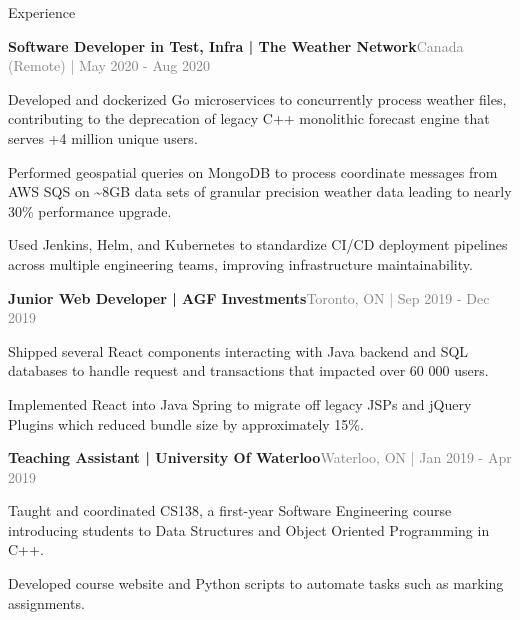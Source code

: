 \documentclass[hidelinks]{resume} %
\begin{document}
\begin{rSection}{Experience}
\begin{rSubsection}{\textbf{Software Developer in Test, Infra | The Weather Network}}{\textcolor{gray}{\small Canada (Remote) | May 2020 - Aug 2020}}{}
        \begin{bulletpoints}
            \vspace{-.10cm}
            \item Developed and dockerized Go microservices to concurrently process weather files, contributing to the deprecation of legacy C++ monolithic forecast engine that serves +4 million unique users.
             \vspace{-.13cm}
            \item Performed geospatial queries on MongoDB to process coordinate messages from AWS SQS on \textasciitilde 8GB data sets of granular precision weather data leading to nearly 30\% performance upgrade.
            \vspace{-.13cm}
             \item Used Jenkins, Helm, and Kubernetes to standardize CI/CD deployment pipelines across multiple engineering teams, improving infrastructure maintainability.
             \vspace{-.10cm}
        \end{bulletpoints}
\end{rSubsection}
\begin{rSubsection}{\textbf{Junior Web Developer | AGF Investments}}{\textcolor{gray}{\small Toronto, ON | Sep 2019 - Dec 2019}}{}
        \par
        \begin{bulletpoints}
            \vspace{-.10cm}
            \item Shipped several React components interacting with Java backend and SQL databases to handle request and transactions that impacted over 60 000 users.
            \vspace{-.13cm}
            \item Implemented React into Java Spring to migrate off legacy JSPs and jQuery Plugins which reduced bundle size by approximately 15\%.
             \vspace{-.10cm}
        \end{bulletpoints}
\end{rSubsection}
\begin{rSubsection}{\textbf{Teaching Assistant | University Of Waterloo}}{\textcolor{gray}{\small Waterloo, ON | Jan 2019 - Apr 2019}}{}

    \begin{bulletpoints}
        \vspace{-.10cm}
        \item Taught and coordinated CS138, a first-year Software Engineering course introducing students to Data Structures and Object Oriented Programming in C++.
        \vspace{-.13cm}
        \item Developed course website and Python scripts to automate tasks such as marking assignments.
        \vspace{-.10cm}
    \end{bulletpoints}   


\end{rSubsection}
\end{rSection}
\end{document}
